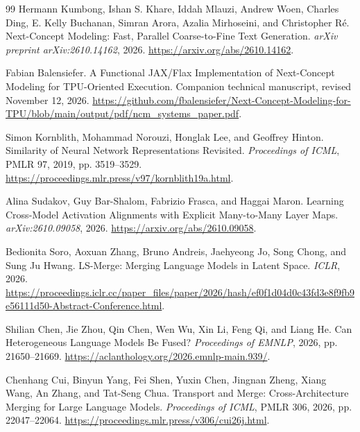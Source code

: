 \begin{thebibliography}{99}
Hermann Kumbong, Ishan S. Khare, Iddah Mlauzi, Andrew Woen, Charles Ding,
E. Kelly Buchanan, Simran Arora, Azalia Mirhoseini, and Christopher R\'e.
\newblock Next-Concept Modeling: Fast, Parallel Coarse-to-Fine Text Generation.
\newblock \emph{arXiv preprint arXiv:2610.14162}, 2026.
\newblock \url{https://arxiv.org/abs/2610.14162}.

Fabian Balensiefer.
\newblock A Functional JAX/Flax Implementation of Next-Concept Modeling for TPU-Oriented Execution.
\newblock Companion technical manuscript, revised November 12, 2026.
\newblock \url{https://github.com/fbalensiefer/Next-Concept-Modeling-for-TPU/blob/main/output/pdf/ncm_systems_paper.pdf}.

Simon Kornblith, Mohammad Norouzi, Honglak Lee, and Geoffrey Hinton.
\newblock Similarity of Neural Network Representations Revisited.
\newblock \emph{Proceedings of ICML}, PMLR 97, 2019, pp. 3519--3529.
\newblock \url{https://proceedings.mlr.press/v97/kornblith19a.html}.

Alina Sudakov, Guy Bar-Shalom, Fabrizio Frasca, and Haggai Maron.
\newblock Learning Cross-Model Activation Alignments with Explicit Many-to-Many Layer Maps.
\newblock \emph{arXiv:2610.09058}, 2026. \url{https://arxiv.org/abs/2610.09058}.

Bedionita Soro, Aoxuan Zhang, Bruno Andreis, Jaehyeong Jo, Song Chong, and Sung Ju Hwang.
\newblock LS-Merge: Merging Language Models in Latent Space.
\newblock \emph{ICLR}, 2026.
\newblock \url{https://proceedings.iclr.cc/paper_files/paper/2026/hash/ef0f1d04d0c43fd3e8f9fb9e56111d50-Abstract-Conference.html}.

Shilian Chen, Jie Zhou, Qin Chen, Wen Wu, Xin Li, Feng Qi, and Liang He.
\newblock Can Heterogeneous Language Models Be Fused?
\newblock \emph{Proceedings of EMNLP}, 2026, pp. 21650--21669.
\newblock \url{https://aclanthology.org/2026.emnlp-main.939/}.

Chenhang Cui, Binyun Yang, Fei Shen, Yuxin Chen, Jingnan Zheng, Xiang Wang,
An Zhang, and Tat-Seng Chua.
\newblock Transport and Merge: Cross-Architecture Merging for Large Language Models.
\newblock \emph{Proceedings of ICML}, PMLR 306, 2026, pp. 22047--22064.
\newblock \url{https://proceedings.mlr.press/v306/cui26j.html}.


\end{thebibliography}
